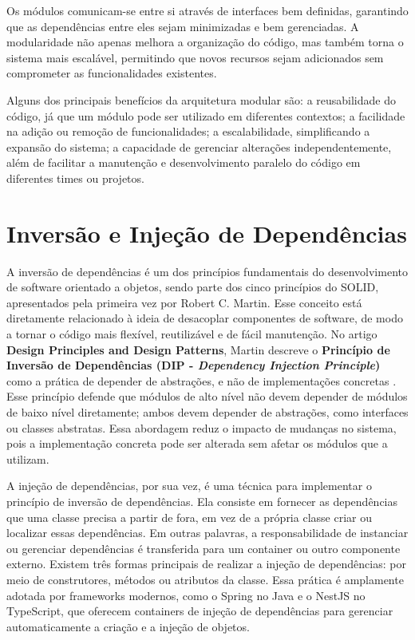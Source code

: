 Os módulos comunicam-se entre si através de interfaces bem definidas, garantindo que as dependências entre eles sejam minimizadas e bem gerenciadas. A modularidade não apenas melhora a organização do código, mas também torna o sistema mais escalável, permitindo que novos recursos sejam adicionados sem comprometer as funcionalidades existentes.

Alguns dos principais benefícios da arquitetura modular são: a reusabilidade do código, já que um módulo pode ser utilizado em diferentes contextos; a facilidade na adição ou remoção de funcionalidades; a escalabilidade, simplificando a expansão do sistema; a capacidade de gerenciar alterações independentemente, além de facilitar a manutenção e desenvolvimento paralelo do código em diferentes times ou projetos.

\section{Inversão e Injeção de Dependências}
A inversão de dependências é um dos princípios fundamentais do desenvolvimento de software orientado a objetos, sendo parte dos cinco princípios do SOLID, apresentados pela primeira vez por Robert C. Martin. Esse conceito está diretamente relacionado à ideia de desacoplar componentes de software, de modo a tornar o código mais flexível, reutilizável e de fácil manutenção. No artigo \textbf{Design Principles and Design Patterns}, Martin descreve o \textbf{Princípio de Inversão de Dependências (DIP - \textit{Dependency Injection Principle})} como a prática de depender de abstrações, e não de implementações concretas \cite[p.~12]{martin2000design}. Esse princípio defende que módulos de alto nível não devem depender de módulos de baixo nível diretamente; ambos devem depender de abstrações, como interfaces ou classes abstratas. Essa abordagem reduz o impacto de mudanças no sistema, pois a implementação concreta pode ser alterada sem afetar os módulos que a utilizam.

A injeção de dependências, por sua vez, é uma técnica para implementar o princípio de inversão de dependências. Ela consiste em fornecer as dependências que uma classe precisa a partir de fora, em vez de a própria classe criar ou localizar essas dependências. Em outras palavras, a responsabilidade de instanciar ou gerenciar dependências é transferida para um container ou outro componente externo. Existem três formas principais de realizar a injeção de dependências: por meio de construtores, métodos ou atributos da classe. Essa prática é amplamente adotada por frameworks modernos, como o Spring no Java e o NestJS no TypeScript, que oferecem containers de injeção de dependências para gerenciar automaticamente a criação e a injeção de objetos.

